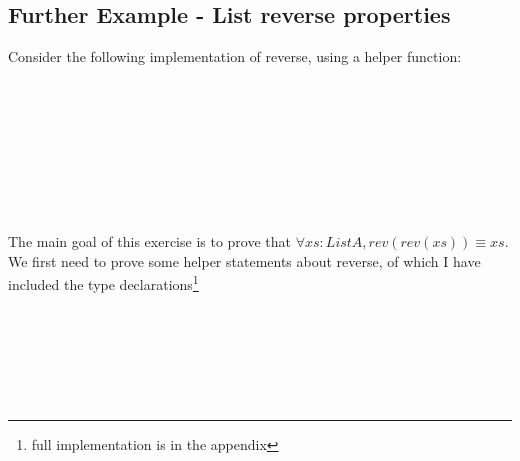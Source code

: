 \documentclass[12pt,twoside,notitlepage]{report}
\begin{document}
\subsection{Further Example - List reverse properties}
Consider the following implementation of reverse, using a helper function: 

\begin{code}
\\
\> \AgdaSymbol{:} \AgdaSymbol{\{} \AgdaSymbol{:} \AgdaSymbol{\}}  \AgdaSymbol{(} \AgdaSymbol{)}  \AgdaSymbol{(} \AgdaSymbol{)}   \<%
\\
\> \AgdaInductiveConstructor{[]}  \AgdaSymbol{=} \<%
\\
\> \AgdaSymbol{(}  \AgdaSymbol{)}  \AgdaSymbol{=}   \AgdaSymbol{(}  \AgdaSymbol{)}\<%
\\
%
\\
\> \AgdaSymbol{:} \AgdaSymbol{\{} \AgdaSymbol{:} \AgdaSymbol{\}}      \<%
\\
\>  \AgdaSymbol{=}   \AgdaInductiveConstructor{[]}\<%
\\
\end{code}

The main goal of this exercise is to prove that $\forall xs : List A, rev (rev (xs)) \equiv xs$. We first need to prove some helper statements about reverse, of which I have included the type declarations\footnote{full implementation is in the appendix}

\begin{code}
\\
\> \AgdaSymbol{:}  \AgdaSymbol{\{}\AgdaSymbol{\}}\<%
\\
\>[0]\<[10]%
\>[10] \AgdaSymbol{(} \AgdaSymbol{:}  \AgdaSymbol{)}\<%
\\
\>[0]\<[10]%
\>[10] \AgdaSymbol{(} \AgdaSymbol{:}  \AgdaSymbol{)}\<%
\\
\>[0]\<[10]%
\>[10]     \AgdaSymbol{(} \AgdaSymbol{)} \AgdaFunction{++} \<%
\\
\end{code}
\end{document}
